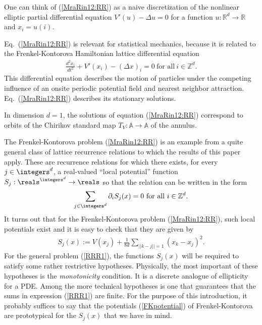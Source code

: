 \begin{description}
One can think of (\ref{MraRin12:RR}) as a naive discretization of the
nonlinear elliptic partial differential equation $V'(u) - \Delta u=0$ for
a function $u: \mathbb{R}^d\to \mathbb{R}$ and $x_i = u(i)$.

Eq.~(\ref{MraRin12:RR}) is relevant for statistical mechanics, because it is
related to the Frenkel-Kontorova Hamiltonian lattice differential
equation
\begin{align} \label{FKHam}
\frac{d^2 x_i}{dt^2} + V'(x_i) - (\Delta x)_i = 0 \ \mbox{for all} \ i\in\mathbb{Z}^d.
\end{align}
This differential equation describes the motion of particles under the
competing influence of an onsite periodic potential field and nearest
neighbor attraction. Eq.~(\ref{MraRin12:RR}) describes its
stationary solutions.

In dimension $d=1$, the solutions of equation (\ref{MraRin12:RR})
correspond to orbits of the Chirikov standard map
$T_V:\mathbb{A}\to\mathbb{A}$ of the annulus.

The Frenkel-Kontorova problem (\ref{MraRin12:RR}) is an example from a quite
general class of lattice recurrence relations to which the results of
this paper apply. These are recurrence relations for which there exists,
for every $j\in \integers^d$, a real-valued ``local potential'' function
$S_j:\reals^{\integers^d}\to \reals$ so that the relation can be written in the form
\begin{align}\label{RRR1}
\sum_{j\in \integers^d} \partial_iS_j(x) = 0\ \mbox{for all} \ i\in \mathbb{Z}^d .
\end{align}
It turns out that for the Frenkel-Kontorova problem (\ref{MraRin12:RR}), such
local potentials exist and it is easy to check that they are given by
 \begin{align}\label{FKpotential}
 S_j(x):= V(x_j) + \frac{1}{8d} \sum_{||k-j||=1}(x_k-x_j)^2.
 \end{align}
For the general problem (\ref{RRR1}), the functions $S_j(x)$ will be
required to satisfy some rather restrictive hypotheses.
Physically, the most
important of these hypotheses is the {\it monotonicity} condition. It is
a discrete analogue of ellipticity for a PDE. Among the more technical
hypotheses is one that guarantees that the sums in expression
(\ref{RRR1}) are finite. For the purpose of this introduction, it
probably suffices to say that the potentials (\ref{FKpotential}) of
Frenkel-Kontorova are prototypical for the $S_j(x)$ that we have in mind.


\end{description}
